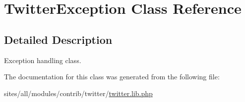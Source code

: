 \hypertarget{classTwitterException}{
\section{TwitterException Class Reference}
\label{classTwitterException}
}


\subsection{Detailed Description}
Exception handling class. 

The documentation for this class was generated from the following file:\begin{CompactItemize}
\item 
sites/all/modules/contrib/twitter/\hyperlink{twitter_8lib_8php}{twitter.lib.php}\end{CompactItemize}
